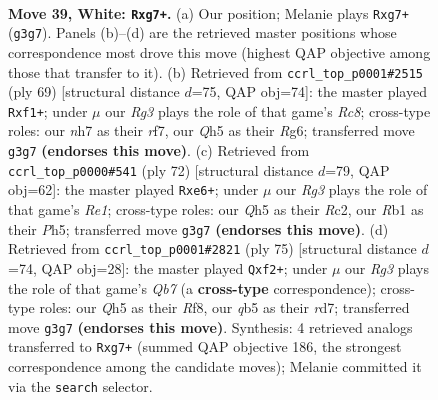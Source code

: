 \documentclass[11pt]{article}
\begin{document}
\clearpage

\begin{figure}[p]\centering
\begin{subfigure}{0.46\textwidth}\centering
\resizebox{\linewidth}{!}{%
\newchessgame
\chessboard[
  setfen={5rk1/6rn/8/pqp4Q/5B2/1P4R1/P7/1R4K1 w - - 3 39},
  showmover=false,
  pgfstyle=straightmove, color=movearrow, markmove={g3-g7}
]}
\caption{}
\end{subfigure}\hfill
\begin{subfigure}{0.46\textwidth}\centering
\resizebox{\linewidth}{!}{%
\newchessgame
\chessboard[
  setfen={8/5R2/p5rk/1p6/7p/6qP/4Q1P1/2r2RK1 b - - 4 35},
  showmover=false,
  pgfstyle=straightmove, color=movearrow, markmove={c1-f1}
]}
\caption{}
\end{subfigure}
\\[4pt]
\begin{subfigure}{0.46\textwidth}\centering
\resizebox{\linewidth}{!}{%
\newchessgame
\chessboard[
  setfen={8/pp5Q/3krb2/2n4P/3q4/8/PPR5/K3R3 w - - 9 37},
  showmover=false,
  pgfstyle=straightmove, color=movearrow, markmove={e1-e6}
]}
\caption{}
\end{subfigure}\hfill
\begin{subfigure}{0.46\textwidth}\centering
\resizebox{\linewidth}{!}{%
\newchessgame
\chessboard[
  setfen={5rk1/3R1R2/2p1p1p1/8/p5P1/4N3/1q3QK1/2r5 b - - 2 38},
  showmover=false,
  pgfstyle=straightmove, color=movearrow, markmove={b2-f2}
]}
\caption{}
\end{subfigure}
\caption{\textbf{Move 39, White: \texttt{Rxg7+}.} (a) Our position; Melanie plays \texttt{Rxg7+} (\texttt{g3g7}). Panels (b)--(d) are the retrieved master positions whose correspondence most drove this move (highest QAP objective among those that transfer to it). (b) Retrieved from \texttt{ccrl\_top\_p0001\#2515} (ply 69) [structural distance $d$=75, QAP obj=74]: the master played \texttt{Rxf1+}; under $\mu$ our \emph{Rg3} plays the role of that game's \emph{Rc8}; cross-type roles: our \emph{n}h7 as their \emph{r}f7, our \emph{Q}h5 as their \emph{R}g6; transferred move \texttt{g3g7} \textbf{(endorses this move)}. (c) Retrieved from \texttt{ccrl\_top\_p0000\#541} (ply 72) [structural distance $d$=79, QAP obj=62]: the master played \texttt{Rxe6+}; under $\mu$ our \emph{Rg3} plays the role of that game's \emph{Re1}; cross-type roles: our \emph{Q}h5 as their \emph{R}c2, our \emph{R}b1 as their \emph{P}h5; transferred move \texttt{g3g7} \textbf{(endorses this move)}. (d) Retrieved from \texttt{ccrl\_top\_p0001\#2821} (ply 75) [structural distance $d$=74, QAP obj=28]: the master played \texttt{Qxf2+}; under $\mu$ our \emph{Rg3} plays the role of that game's \emph{Qb7} (a \textbf{cross-type} correspondence); cross-type roles: our \emph{Q}h5 as their \emph{R}f8, our \emph{q}b5 as their \emph{r}d7; transferred move \texttt{g3g7} \textbf{(endorses this move)}. Synthesis: 4 retrieved analogs transferred to \texttt{Rxg7+} (summed QAP objective 186, the strongest correspondence among the candidate moves); Melanie committed it via the \texttt{search} selector.}
\label{fig:thought-m76}
\end{figure}
\end{document}

